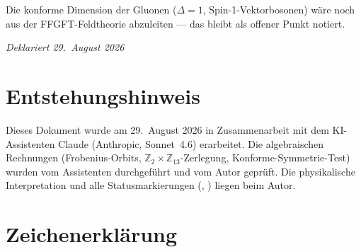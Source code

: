 Die konforme Dimension der Gluonen ($\Delta=1$, Spin-1-Vektorbosonen) wäre
noch aus der FFGFT-Feldtheorie abzuleiten — das bleibt als offener Punkt
notiert.

\emph{Deklariert 29.~August 2026}

\section{Entstehungshinweis}

Dieses Dokument wurde am 29.~August 2026 in Zusammenarbeit mit dem
KI-Assistenten Claude (Anthropic, Sonnet~4.6) erarbeitet. Die algebraischen
Rechnungen (Frobenius-Orbits, $\mathbb{Z}_2\times\mathbb{Z}_{13}$-Zerlegung,
Konforme-Symmetrie-Test) wurden vom Assistenten durchgeführt und vom Autor
geprüft. Die physikalische Interpretation und alle Statusmarkierungen
(\BM, \KM) liegen beim Autor.

\section{Zeichenerklärung}



